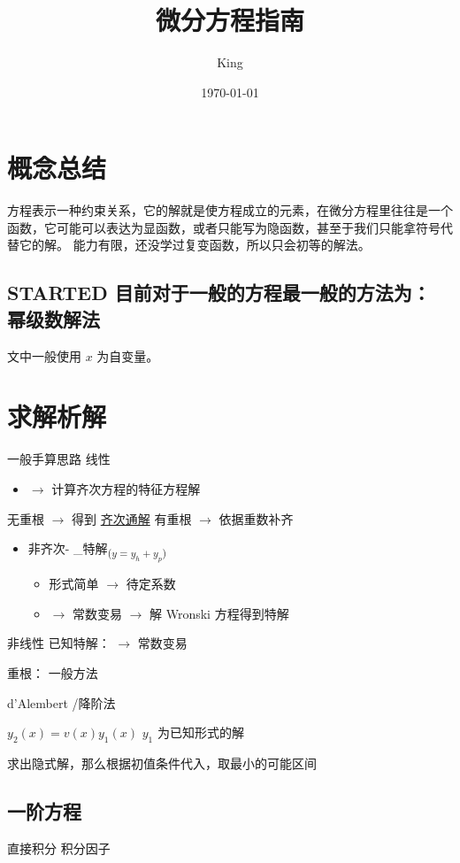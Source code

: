 \documentclass[11pt]{report}
\author{King}
\date{\today}
\title{微分方程指南}
\begin{document}
\maketitle
\tableofcontents



\part{概念总结}
\label{sec:orgbaa0094}
方程表示一种约束关系，它的解就是使方程成立的元素，在微分方程里往往是一个函数，它可能可以表达为显函数，或者只能写为隐函数，甚至于我们只能拿符号代替它的解。
能力有限，还没学过复变函数，所以只会初等的解法。

\chapter{{\bfseries\sffamily STARTED} 目前对于一般的方程最一般的方法为： \textbf{幂级数解法}}
\label{sec:org8f0930e}

文中一般使用 \(x\) 为自变量。
\part{求解析解}
\label{sec:org6cdb1d7}
一般手算思路
线性
\begin{itemize}
\item \(\rightarrow\) 计算齐次方程的特征方程解
\end{itemize}
无重根 \(\rightarrow\) 得到 \uline{齐次通解}
有重根 \(\rightarrow\) 依据重数补齐
\begin{itemize}
\item 非齐次- \_特解\textsubscript{(\(y=y_h+y_p\))}
\begin{itemize}
\item 形式简单
\(\rightarrow\) 待定系数
\item \(\rightarrow\) 常数变易 \(\rightarrow\) 解 Wronski 方程得到特解
\end{itemize}
\end{itemize}

非线性
已知特解：
\(\rightarrow\) 常数变易


重根：
一般方法

d'Alembert /降阶法

\(y_2(x)=v(x)y_1(x)\)
\(y_1\) 为已知形式的解


求出隐式解，那么根据初值条件代入，取最小的可能区间
\chapter{一阶方程}
\label{sec:org807a2d4}
直接积分
积分因子
\end{document}
